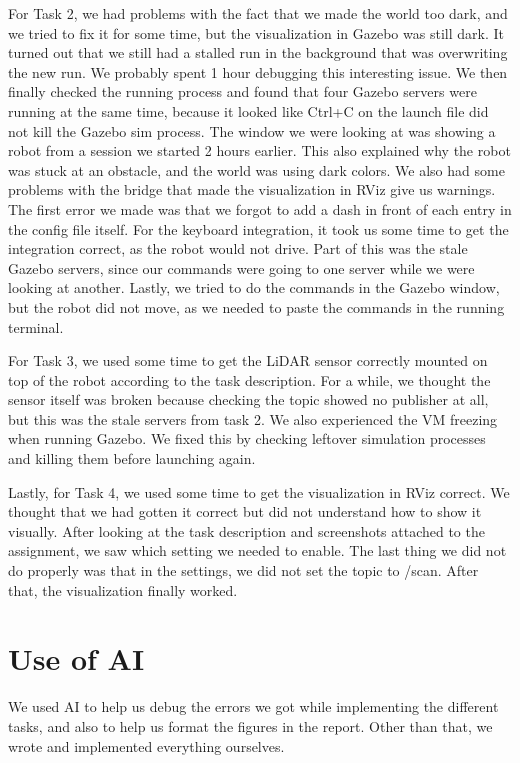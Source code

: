 \documentclass[conference]{IEEEtran}
\begin{document}
For Task 2, we had problems with the fact that we made the world too dark, and we tried to fix it for some time, but the visualization in Gazebo was still dark. It turned out that we still had a stalled run in the background that was overwriting the new run. We probably spent 1 hour debugging this interesting issue. We then finally checked the running process and found that four Gazebo servers were running at the same time, because it looked like Ctrl+C on the launch file did not kill the Gazebo sim process. The window we were looking at was showing a robot from a session we started 2 hours earlier. This also explained why the robot was stuck at an obstacle, and the world was using dark colors. We also had some problems with the bridge that made the visualization in RViz give us warnings. The first error we made was that we forgot to add a dash in front of each entry in the config file itself. For the keyboard integration, it took us some time to get the integration correct, as the robot would not drive. Part of this was the stale Gazebo servers, since our commands were going to one server while we were looking at another. Lastly, we tried to do the commands in the Gazebo window, but the robot did not move, as we needed to paste the commands in the running terminal. 

For Task 3, we used some time to get the LiDAR sensor correctly mounted on top of the robot according to the task description. For a while, we thought the sensor itself was broken because checking the topic showed no publisher at all, but this was the stale servers from task 2. We also experienced the VM freezing when running Gazebo. We fixed this by checking leftover simulation processes and killing them before launching again. 

Lastly, for Task 4, we used some time to get the visualization in RViz correct. We thought that we had gotten it correct but did not understand how to show it visually. After looking at the task description and screenshots attached to the assignment, we saw which setting we needed to enable. The last thing we did not do properly was that in the settings, we did not set the topic to /scan. After that, the visualization finally worked. 

\section{Use of AI}
We used AI to help us debug the errors we got while implementing the different tasks, and also to help us format the figures in the report. Other than that, we wrote and implemented everything ourselves.
\end{document}
